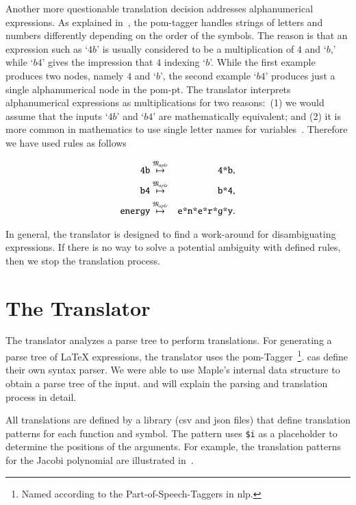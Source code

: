 \documentclass[a4paper,11pt]{article}
\newcommand{\Maple}{Maple}
\newcommand{\langMaple}{\mathfrak{M}_{aple}}
\theoremstyle{defTheoStyle}
\theoremstyle{defExampStyle}
\begin{document}
Another more questionable translation decision addresses alphanumerical expressions. As explained in~, the \gls*{pom}-tagger handles strings of letters and numbers differently depending on the order of the symbols. The reason is that an expression such as `$4b$' is usually considered to be a multiplication of $4$ and `$b$,' while `$b4$' gives the impression that $4$ indexing `$b$'. While the first example produces two nodes, namely $4$ and `$b$', the second example `$b4$' produces just a single alphanumerical node in the \gls*{pom-pt}. The translator interprets alphanumerical expressions as multiplications for two reasons:~(1) we would assume that the inputs `$4b$' and `$b4$' are mathematically equivalent; and (2) it is more common in mathematics to use single letter names for variables~\parencite{Notation:History}. Therefore we have used rules as follows

\begin{eqnarray*}
\verb|4b| & \overset{\langMaple}{\mapsto} & \verb|4*b|,\\
\verb|b4| & \overset{\langMaple}{\mapsto} & \verb|b*4|,\\
\verb|energy| & \overset{\langMaple}{\mapsto} & \verb|e*n*e*r*g*y|.
\end{eqnarray*}

In general, the translator is designed to find a work-around for disambiguating expressions. 
If there is no way to solve a potential ambiguity with defined rules, then we stop the translation process.

\section{The Translator}
The translator analyzes a parse tree to perform translations. For generating a parse tree of \LaTeX{} expressions, the translator uses the \gls*{pom}-Tagger~\parencite{POM-Tagger}\footnote{Named according to the Part-of-Speech-Taggers in \gls*{nlp}.}. \gls*{cas} define their own syntax parser. We were able to use \Maple's internal data structure to 
obtain a parse tree of the input.  and  will explain the parsing and translation process in detail.

All translations are defined by a library (\gls*{csv} and \gls*{json} files) that define translation patterns for each function and symbol. The pattern uses \verb|$i| as a placeholder to determine the positions of the arguments. For example, the translation patterns for the Jacobi polynomial are illustrated in~.
\end{document}
